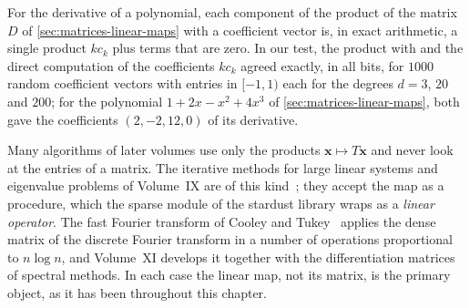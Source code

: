 \begin{table}
\end{table}

For the derivative of a polynomial, each component of the product of the matrix $D$ of \cref{sec:matrices-linear-maps} with a coefficient vector is, in exact arithmetic, a single product $kc_k$ plus terms that are zero. In our test, the product with  and the direct computation of the coefficients $kc_k$ agreed exactly, in all bits, for $1000$ random coefficient vectors with entries in $[-1,1)$ each for the degrees $d=3$, $20$ and $200$; for the polynomial $1+2x-x^2+4x^3$ of \cref{sec:matrices-linear-maps}, both gave the coefficients $(2,-2,12,0)$ of its derivative.

Many algorithms of later volumes use only the products $\mathbf x\mapsto T\mathbf x$ and never look at the entries of a matrix. The iterative methods for large linear systems and eigenvalue problems of Volume~IX are of this kind~\cite{saad2003}; they accept the map as a procedure, which the sparse module of the stardust library wraps as a \emph{linear operator}. The fast Fourier transform of Cooley and Tukey~\cite{cooley1965} applies the dense matrix of the discrete Fourier transform in a number of operations proportional to $n\log n$, and Volume~XI develops it together with the differentiation matrices of spectral methods. In each case the linear map, not its matrix, is the primary object, as it has been throughout this chapter.


